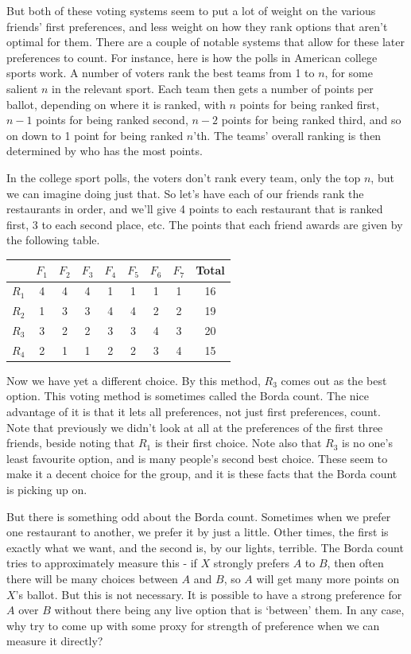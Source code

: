 \documentclass[openany]{book}
\begin{document}
But both of these voting systems seem to put a lot of weight on the various friends' first preferences, and less weight on how they rank options that aren't optimal for them. There are a couple of notable systems that allow for these later preferences to count. For instance, here is how the polls in American college sports work. A number of voters rank the best teams from 1 to $n$, for some salient $n$ in the relevant sport. Each team then gets a number of points per ballot, depending on where it is ranked, with $n$ points for being ranked first, $n-1$ points for being ranked second, $n-2$ points for being ranked third, and so on down to 1 point for being ranked $n$'th. The teams' overall ranking is then determined by who has the most points.

In the college sport polls, the voters don't rank every team, only the top $n$, but we can imagine doing just that. So let's have each of our friends rank the restaurants in order, and we'll give 4 points to each restaurant that is ranked first, 3 to each second place, etc. The points that each friend awards are given by the following table.

\begin{center}
\begin{tabular}{r | c c c c c c c c}
 & $F_1$ & $F_2$ & $F_3$ & $F_4$ & $F_5$ & $F_6$ & $F_7$ & Total \\ \hline
$R_1$ & 4 & 4 & 4 & 1 & 1 & 1 & 1 & 16 \\
$R_2$ & 1 & 3 & 3 & 4 & 4 & 2 & 2 & 19 \\
$R_3$ & 3 & 2 & 2 & 3 & 3 & 4 & 3 & 20 \\
$R_4$ & 2 & 1 & 1 & 2 & 2 & 3 & 4 & 15
\end{tabular}
\end{center}
Now we have yet a different choice. By this method, $R_3$ comes out as the best option. This voting method is sometimes called the Borda count. The nice advantage of it is that it lets all preferences, not just first preferences, count. Note that previously we didn't look at all at the preferences of the first three friends, beside noting that $R_1$ is their first choice. Note also that $R_3$ is no one's least favourite option, and is many people's second best choice. These seem to make it a decent choice for the group, and it is these facts that the Borda count is picking up on.

But there is something odd about the Borda count. Sometimes when we prefer one restaurant to another, we prefer it by just a little. Other times, the first is exactly what we want, and the second is, by our lights, terrible. The Borda count tries to approximately measure this - if $X$ strongly prefers $A$ to $B$, then often there will be many choices between $A$ and $B$, so $A$ will get many more points on $X$'s ballot. But this is not necessary. It is possible to have a strong preference for $A$ over $B$ without there being any live option that is `between' them.  In any case, why try to come up with some proxy for strength of preference when we can measure it directly?
\end{document}
